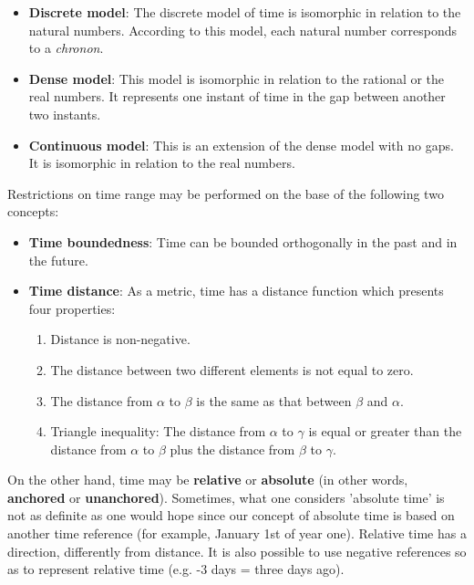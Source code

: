 \begin{itemize}
\item
\textbf{Discrete model}:  The discrete model of time is isomorphic in relation to the natural numbers. According to this model, each natural number corresponds to a \emph{chronon}. 
\item
\textbf{Dense model}: This model is isomorphic in relation to the rational or the real numbers. It represents one instant of time in the gap between another two instants.
\item
\textbf{Continuous model}: This is an extension of the dense model with no gaps. It is isomorphic in relation to the real numbers.
\end{itemize}




Restrictions on time range may be performed on the base of the following two concepts:
\begin{itemize}
\item
\textbf{Time boundedness}: Time can be bounded orthogonally in the past and in the future.
\item
\textbf{Time distance}: As a metric, time has a distance function which presents four properties:
\begin{enumerate}
\item
Distance is non-negative.
\item
The distance between two different elements is not equal to zero.
\item
The distance from $\alpha$ to $\beta$ is the same as that between $\beta$ and $\alpha$.
\item
Triangle inequality: The distance from $\alpha$ to $\gamma$ is equal or greater than the distance from $\alpha$ to $\beta$ plus the distance from $\beta$ to $\gamma$.
\end{enumerate}
\end{itemize}

On the other hand, time may be \textbf{relative} or \textbf{absolute} (in other words, \textbf{anchored} or \textbf{unanchored}). Sometimes, what one considers 'absolute time' is not as definite as one would hope since our concept of absolute time is based on another time reference (for example, January 1st of year one). Relative time has a direction, differently from distance. It is also possible to use negative references so as to represent relative time (e.g. -3 days = three days ago).




